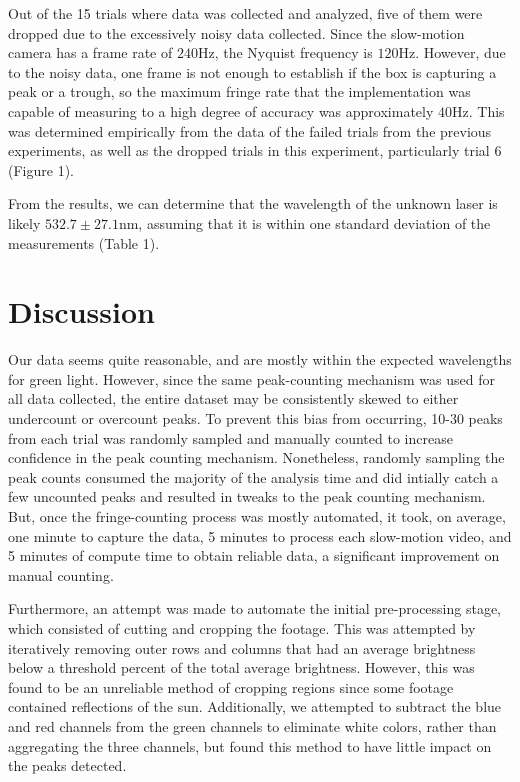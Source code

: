 \documentclass{article}
\begin{document}
Out of the 15 trials where data was collected and analyzed, five of them were dropped due to the excessively noisy data collected. 
Since the slow-motion camera has a frame rate of $240 \si{\hertz}$, the Nyquist frequency is $120 \si{\hertz}$. However, due to the noisy data, one frame is not enough to establish if the box is capturing a peak or a trough, so the maximum fringe rate that the implementation was capable of measuring to a high degree of accuracy was approximately $40 \si{\hertz}$. This was determined empirically from the data of the failed trials from the previous experiments, as well as the dropped trials in this experiment, particularly trial 6 (Figure 1). 

\bigskip

From the results, we can determine that the wavelength of the unknown laser is likely $532.7 \pm 27.1 \si{\nano\meter}$, assuming that it is within one standard deviation of the measurements (Table 1).

\section*{Discussion}
Our data seems quite reasonable, and are mostly within the expected wavelengths for green light. However, since the same peak-counting mechanism was used for all data collected, the entire dataset may be consistently skewed to either undercount or overcount peaks. 
To prevent this bias from occurring, 10-30 peaks from each trial was randomly sampled and manually counted to increase confidence in the peak counting mechanism. Nonetheless, randomly sampling the peak counts consumed the majority of the analysis time and did intially catch a few uncounted peaks and resulted in tweaks to the peak counting mechanism. 
But, once the fringe-counting process was mostly automated, it took, on average, one minute to capture the data, 5 minutes to process each slow-motion video, and 5 minutes of compute time to obtain reliable data, a significant improvement on manual counting. 


\bigskip

Furthermore, an attempt was made to automate the initial pre-processing stage, which consisted of cutting and cropping the footage. This was attempted by iteratively removing outer rows and columns that had an average brightness below a threshold percent of the total average brightness. However, this was found to be an unreliable method of cropping regions since some footage contained reflections of the sun. Additionally, we attempted to subtract the blue and red channels from the green channels to eliminate white colors, rather than aggregating the three channels, but found this method to have little impact on the peaks detected.

\bigskip
\end{document}
